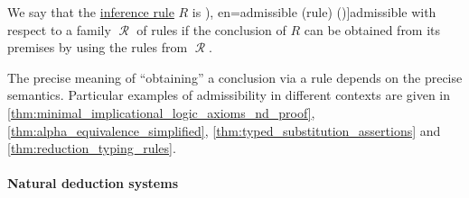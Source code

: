 \begin{concept}\label{con:inference_rule_admissibility}\mimprovised
  We say that the \hyperref[def:inference_rule]{inference rule} \( R \) is \term[ru=допустимое (правило) (\cite[252]{Герасимов2011Вычислимость}), en=admissible (rule) (\cite[76]{TroelstraSchwichtenberg2000BasicProofTheory})]{admissible} with respect to a family \( \mscrR \) of rules if the conclusion of \( R \) can be obtained from its premises by using the rules from \( \mscrR \).
\end{concept}
\begin{comments}
  \item The precise meaning of \enquote{obtaining} a conclusion via a rule depends on the precise semantics. Particular examples of admissibility in different contexts are given in \cref{thm:minimal_implicational_logic_axioms_nd_proof}, \cref{thm:alpha_equivalence_simplified}, \cref{thm:typed_substitution_assertions} and \cref{thm:reduction_typing_rules}.
\end{comments}

\paragraph{Natural deduction systems}


